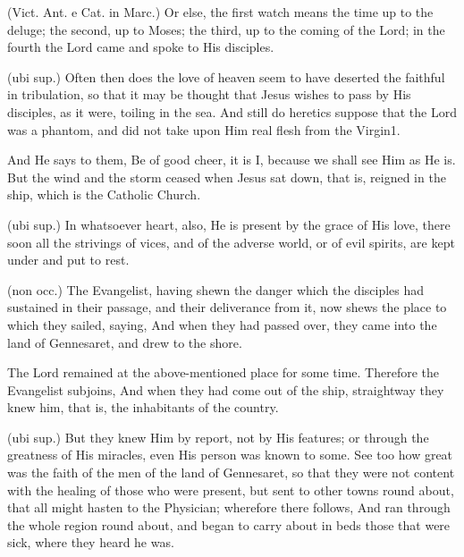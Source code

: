  (Vict. Ant. e Cat. in Marc.) Or else, the first watch means the time up to the deluge; the second, up to Moses; the third, up to the coming of the Lord; in the fourth the Lord came and spoke to His disciples.

 (ubi sup.) Often then does the love of heaven seem to have deserted the faithful in tribulation, so that it may be thought that Jesus wishes to pass by His disciples, as it were, toiling in the sea. And still do heretics suppose that the Lord was a phantom, and did not take upon Him real flesh from the Virgin1.

 And He says to them, Be of good cheer, it is I, because we shall see Him as He is. But the wind and the storm ceased when Jesus sat down, that is, reigned in the ship, which is the Catholic Church.

 (ubi sup.) In whatsoever heart, also, He is present by the grace of His love, there soon all the strivings of vices, and of the adverse world, or of evil spirits, are kept under and put to rest.

 

 (non occ.) The Evangelist, having shewn the danger which the disciples had sustained in their passage, and their deliverance from it, now shews the place to which they sailed, saying, And when they had passed over, they came into the land of Gennesaret, and drew to the shore.

 The Lord remained at the above-mentioned place for some time. Therefore the Evangelist subjoins, And when they had come out of the ship, straightway they knew him, that is, the inhabitants of the country.

 (ubi sup.) But they knew Him by report, not by His features; or through the greatness of His miracles, even His person was known to some. See too how great was the faith of the men of the land of Gennesaret, so that they were not content with the healing of those who were present, but sent to other towns round about, that all might hasten to the Physician; wherefore there follows, And ran through the whole region round about, and began to carry about in beds those that were sick, where they heard he was.

